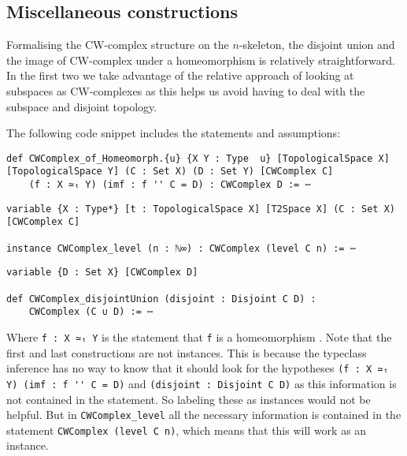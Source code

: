 \subsection{Miscellaneous constructions}

Formalising the CW-complex structure on the $n$-skeleton, the disjoint union and the image of CW-complex under a homeomorphism is relatively straightforward. 
In the first two we take advantage of the relative approach of looking at subspaces as CW-complexes as this helps us avoid having to deal with the subspace and disjoint topology. 

The following code snippet includes the statements and assumptions:

\begin{lstlisting}
def CWComplex_of_Homeomorph.{u} {X Y : Type  u} [TopologicalSpace X] [TopologicalSpace Y] (C : Set X) (D : Set Y) [CWComplex C] 
    (f : X ≃ₜ Y) (imf : f '' C = D) : CWComplex D := ⋯
\end{lstlisting}
\href{https://github.com/scholzhannah/CWComplexes/blob/7be4872a05b534011cc969eb5b80a4b7f0bf57e2/CWcomplexes/Constructions.lean#L140-L182}{\faExternalLink}

\begin{lstlisting}
variable {X : Type*} [t : TopologicalSpace X] [T2Space X] (C : Set X) [CWComplex C]

instance CWComplex_level (n : ℕ∞) : CWComplex (level C n) := ⋯
\end{lstlisting}
\href{https://github.com/scholzhannah/CWComplexes/blob/7be4872a05b534011cc969eb5b80a4b7f0bf57e2/CWcomplexes/Constructions.lean#L66-L67}{\faExternalLink}

\begin{lstlisting}
variable {D : Set X} [CWComplex D] 

def CWComplex_disjointUnion (disjoint : Disjoint C D) : 
    CWComplex (C ∪ D) := ⋯
\end{lstlisting}
\href{https://github.com/scholzhannah/CWComplexes/blob/7be4872a05b534011cc969eb5b80a4b7f0bf57e2/CWcomplexes/Constructions.lean#L71-L136}{\faExternalLink}

Where \lstinline{f : X ≃ₜ Y} is the statement that \lstinline{f} is a homeomorphism
\href{https://github.com/leanprover-community/mathlib4/blob/ed125a4216d18273cb1b96d4c846d32b85d74faf/Mathlib/Topology/Homeomorph.lean#L37-L43}{\faExternalLink}. 
Note that the first and last constructions are not instances.
This is because the typeclass inference has no way to know that it should look for the hypotheses \lstinline{(f : X ≃ₜ Y) (imf : f '' C = D)} and \lstinline{(disjoint : Disjoint C D)} as this information is not contained in the statement. 
So labeling these as instances would not be helpful. 
But in \lstinline{CWComplex_level} all the necessary information is contained in the statement \lstinline{CWComplex (level C n)}, which means that this will work as an instance.